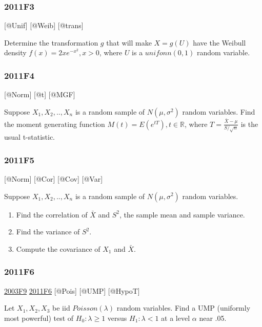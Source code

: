 \documentclass[6pt,twocolumn,Portrait]{article}
\begin{document}
\hypertarget{f3-4}{%
\subsubsection{2011F3}\label{f3-4}}

{[}@Unif{]} {[}@Weib{]} {[}@trans{]}

Determine the transformation \(g\) that will make \(X=g(U)\) have the
Weibull density \(f(x)=2xe^{-x^2},x>0\), where \(U\) is a
\(unifonn(0,1)\) random variable.

\hypertarget{f4-4}{%
\subsubsection{2011F4}\label{f4-4}}

{[}@Norm{]} {[}@t{]} {[}@MGF{]}

Suppose \(X_1,X_2,..,X_{n}\) is a random sample of \(N(\mu,\sigma^2)\)
random variables. Find the moment generating function
\(M(t)=E(e^{tT}),t\in\mathbb R\), where
\(T=\frac{\bar X-\mu}{S/\sqrt{n}}\) is the usual t-statistic.

\hypertarget{f5-4}{%
\subsubsection{2011F5}\label{f5-4}}

{[}@Norm{]} {[}@Cor{]} {[}@Cov{]} {[}@Var{]}

Suppose \(X_1,X_2,..,X_{n}\) is a random sample of \(N(\mu,\sigma^2)\)
random variables.

\begin{enumerate}
\def\labelenumi{(\alph{enumi})}
\item
  Find the correlation of \(\bar X\) and \(S^2\), the sample mean and
  sample variance.
\item
  Find the variance of \(S^2\).
\item
  Compute the covariance of \(X_1\) and \(\bar X\).
\end{enumerate}

\hypertarget{f6-4}{%
\subsubsection{2011F6}\label{f6-4}}

\protect\hyperlink{f9-1}{2003F9} \protect\hyperlink{f6-4}{2011F6}
{[}@Pois{]} {[}@UMP{]} {[}@HypoT{]}

Let \(X_1,X_2,X_3\) be iid \(Poisson(\lambda)\) random variables. Find a
UMP (uniformly most powerful) test of \(H_0:\lambda\ge1\) versus
\(H_1:\lambda<1\) at a level \(\alpha\) near .05.
\end{document}
